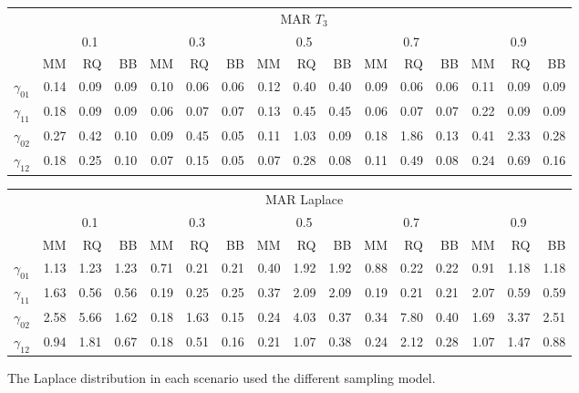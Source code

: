 \documentclass[12pt]{article}
\begin{document}
\begin{table}[ht]
  \begin{tabular}{rrrrrrrrrrrrrrrr}
    \toprule
    & \multicolumn{ 15}{c}{MAR $T_3$} \\
    \cline{2-16}
    &  \multicolumn{3}{c}{0.1} &  \multicolumn{3}{c}{0.3} &  \multicolumn{3}{c}{0.5} &
    \multicolumn{3}{c}{0.7} &  \multicolumn{3}{c}{0.9} \\
    \cline{2-16}
    & MM   & RQ   & BB   & MM   & RQ   & BB   & MM   & RQ   & BB   & MM   & RQ   & BB   & MM   & RQ   & BB   \\
    \hline
    $\gamma_{01}$  & 0.14 & 0.09 & 0.09 & 0.10 & 0.06 & 0.06 & 0.12 & 0.40 & 0.40 & 0.09 & 0.06 & 0.06 & 0.11 & 0.09 & 0.09 \\
    $\gamma_{11}$  & 0.18 & 0.09 & 0.09 & 0.06 & 0.07 & 0.07 & 0.13 & 0.45 & 0.45 & 0.06 & 0.07 & 0.07 & 0.22 & 0.09 & 0.09 \\
    $\gamma_{02}$  & 0.27 & 0.42 & 0.10 & 0.09 & 0.45 & 0.05 & 0.11 & 1.03 & 0.09 & 0.18 & 1.86 & 0.13 & 0.41 & 2.33 & 0.28 \\
    $\gamma_{12}$  & 0.18 & 0.25 & 0.10 & 0.07 & 0.15 & 0.05 & 0.07 & 0.28 & 0.08 & 0.11 & 0.49 & 0.08 & 0.24 & 0.69 & 0.16 \\
    \bottomrule
  \end{tabular}

  \begin{tabular}{rrrrrrrrrrrrrrrr}
    \hline
    & \multicolumn{15}{c}{MAR Laplace } \\
    \cline{2-16}
    &  \multicolumn{3}{c}{0.1} &  \multicolumn{3}{c}{0.3} &  \multicolumn{3}{c}{0.5} &
    \multicolumn{3}{c}{0.7} &  \multicolumn{3}{c}{0.9} \\
    \cline{2-16}
    & MM   & RQ   & BB   & MM   & RQ   & BB   & MM   & RQ   & BB   & MM   & RQ   & BB   & MM   & RQ   & BB   \\
    \hline
    $\gamma_{01}$ & 1.13 & 1.23 & 1.23 & 0.71 & 0.21 & 0.21 & 0.40 & 1.92 & 1.92 & 0.88 & 0.22 & 0.22 & 0.91 & 1.18 & 1.18 \\
    $\gamma_{11}$ & 1.63 & 0.56 & 0.56 & 0.19 & 0.25 & 0.25 & 0.37 & 2.09 & 2.09 & 0.19 & 0.21 & 0.21 & 2.07 & 0.59 & 0.59 \\
    $\gamma_{02}$ & 2.58 & 5.66 & 1.62 & 0.18 & 1.63 & 0.15 & 0.24 & 4.03 & 0.37 & 0.34 & 7.80 & 0.40 & 1.69 & 3.37 & 2.51 \\
    $\gamma_{12}$ & 0.94 & 1.81 & 0.67 & 0.18 & 0.51 & 0.16 & 0.21 & 1.07 & 0.38 & 0.24 & 2.12 & 0.28 & 1.07 & 1.47 & 0.88 \\
    \hline
  \end{tabular}

  The Laplace distribution in each scenario used the different sampling model.

\end{table}
\end{document}
